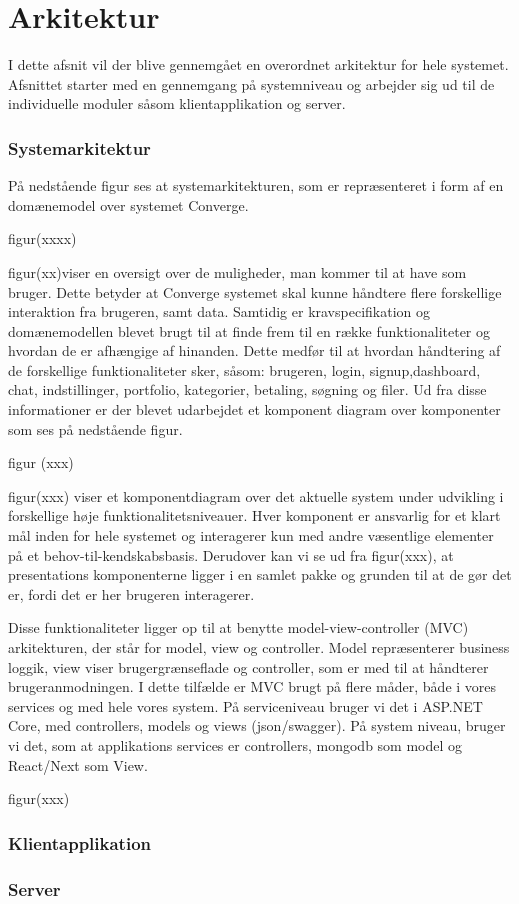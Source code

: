 \chapter{Arkitektur}
I dette afsnit vil der blive gennemgået en overordnet arkitektur for hele systemet. Afsnittet starter med en gennemgang på  systemniveau og arbejder sig ud til de individuelle moduler såsom klientapplikation og server.  

\subsection{Systemarkitektur}
På nedstående figur ses at systemarkitekturen, som er repræsenteret i form af en domænemodel over systemet Converge.

figur(xxxx)

figur(xx)viser en oversigt over de muligheder, man kommer til at have som bruger. Dette betyder at Converge systemet
skal kunne håndtere flere forskellige interaktion fra brugeren, samt data. Samtidig er kravspecifikation og domænemodellen
blevet brugt til at finde frem til en række funktionaliteter og hvordan de er afhængige af hinanden. Dette
medfør til at hvordan håndtering af de forskellige funktionaliteter sker, såsom: brugeren, login, signup,dashboard,
chat, indstillinger, portfolio, kategorier, betaling, søgning og filer. Ud fra disse informationer er der blevet udarbejdet
et komponent diagram over komponenter som ses på nedstående figur.

figur (xxx)

figur(xxx) viser et komponentdiagram over det aktuelle system under udvikling i forskellige høje funktionalitetsniveauer.
Hver komponent er ansvarlig for et klart mål inden for hele systemet og interagerer kun med andre væsentlige
elementer på et behov-til-kendskabsbasis. Derudover kan vi se ud fra figur(xxx), at presentations komponenterne
ligger i en samlet pakke og grunden til at de gør det er, fordi det er her brugeren interagerer.

Disse funktionaliteter ligger op til at benytte model-view-controller (MVC) arkitekturen, der står for model, view og
controller. Model repræsenterer business loggik, view viser brugergrænseflade og controller, som er med til at håndterer
brugeranmodningen. I dette tilfælde er MVC brugt på flere måder, både i vores services og med hele vores
system. På serviceniveau bruger vi det i ASP.NET Core, med controllers, models og views (json/swagger). På system
niveau, bruger vi det, som at applikations services er controllers, mongodb som model og React/Next som
View.

figur(xxx)

\subsection{Klientapplikation}
\subsection{Server}